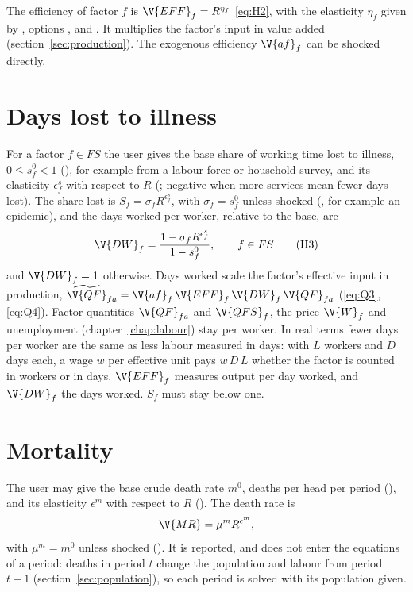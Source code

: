 The efficiency of factor $f$ is $\V{EFF}_f = R^{\eta_f}$ \eqref{eq:H2}, with
the elasticity $\eta_f$ given by , options
,  and . It multiplies the
factor's input in value added (section~\ref{sec:production}). The exogenous
efficiency $\V{af}_f$ can be shocked directly.

\section{Days lost to illness}\label{sec:sickdays}

For a factor $f \in FS$ the user gives the base share of working time lost to
illness, $0 \le s^0_f < 1$ (), for example from a labour force
or household survey, and its elasticity $\epsilon^s_f$ with respect to $R$
(; negative when more services mean fewer days lost). The
share lost is $S_f = \sigma_f R^{\epsilon^s_f}$, with $\sigma_f = s^0_f$ unless
shocked (, for example an epidemic), and the days worked per worker,
relative to the base, are
\begin{equation}
\V{DW}_f = \frac{1 - \sigma_f R^{\epsilon^s_f}}{1 - s^0_f}, \qquad f \in FS
\tag{H3}\label{eq:H3}
\end{equation}
and $\V{DW}_f = 1$ otherwise. Days worked scale the factor's effective input
in production, $\widetilde{\V{QF}}_{fa} = \V{af}_f\,\V{EFF}_f\,\V{DW}_f\,\V{QF}_{fa}$
(\eqref{eq:Q3}, \eqref{eq:Q4}). Factor quantities $\V{QF}_{fa}$ and
$\V{QFS}_f$, the price $\V{W}_f$ and unemployment (chapter~\ref{chap:labour})
stay per worker. In real terms fewer days per worker are the same as less
labour measured in days: with $L$ workers and $D$ days each, a wage $w$ per
effective unit pays $w\,D\,L$ whether the factor is counted in workers or in
days. $\V{EFF}_f$ measures output per day worked, and $\V{DW}_f$ the days
worked. $S_f$ must stay below one.

\section{Mortality}\label{sec:mortality}

The user may give the base crude death rate $m^0$, deaths per head per period
(), and its elasticity $\epsilon^m$ with respect to $R$
(). The death rate is
\begin{equation*}
\V{MR} = \mu^m R^{\epsilon^m},
\end{equation*}
with $\mu^m = m^0$ unless shocked (). It is reported, and does not
enter the equations of a period: deaths in period $t$ change the population
and labour from period $t + 1$ (section~\ref{sec:population}), so each period
is solved with its population given.

